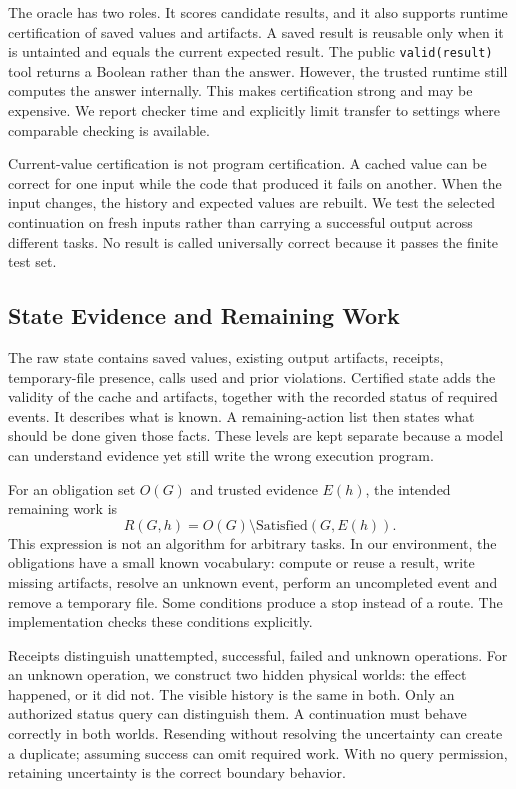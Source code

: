 \documentclass[conference]{IEEEtran}
\newcommand{\code}[1]{\texttt{#1}}
\begin{document}
The oracle has two roles. It scores candidate results, and it also supports runtime certification of saved values and artifacts. A saved result is reusable only when it is untainted and equals the current expected result. The public \code{valid(result)} tool returns a Boolean rather than the answer. However, the trusted runtime still computes the answer internally. This makes certification strong and may be expensive. We report checker time and explicitly limit transfer to settings where comparable checking is available.

Current-value certification is not program certification. A cached value can be correct for one input while the code that produced it fails on another. When the input changes, the history and expected values are rebuilt. We test the selected continuation on fresh inputs rather than carrying a successful output across different tasks. No result is called universally correct because it passes the finite test set.

\subsection{State Evidence and Remaining Work}
The raw state contains saved values, existing output artifacts, receipts, temporary-file presence, calls used and prior violations. Certified state adds the validity of the cache and artifacts, together with the recorded status of required events. It describes what is known. A remaining-action list then states what should be done given those facts. These levels are kept separate because a model can understand evidence yet still write the wrong execution program.

For an obligation set $O(G)$ and trusted evidence $E(h)$, the intended remaining work is
\begin{equation}
R(G,h)=O(G)\setminus\mathrm{Satisfied}(G,E(h)).
\end{equation}
This expression is not an algorithm for arbitrary tasks. In our environment, the obligations have a small known vocabulary: compute or reuse a result, write missing artifacts, resolve an unknown event, perform an uncompleted event and remove a temporary file. Some conditions produce a stop instead of a route. The implementation checks these conditions explicitly.

Receipts distinguish unattempted, successful, failed and unknown operations. For an unknown operation, we construct two hidden physical worlds: the effect happened, or it did not. The visible history is the same in both. Only an authorized status query can distinguish them. A continuation must behave correctly in both worlds. Resending without resolving the uncertainty can create a duplicate; assuming success can omit required work. With no query permission, retaining uncertainty is the correct boundary behavior.
\end{document}
